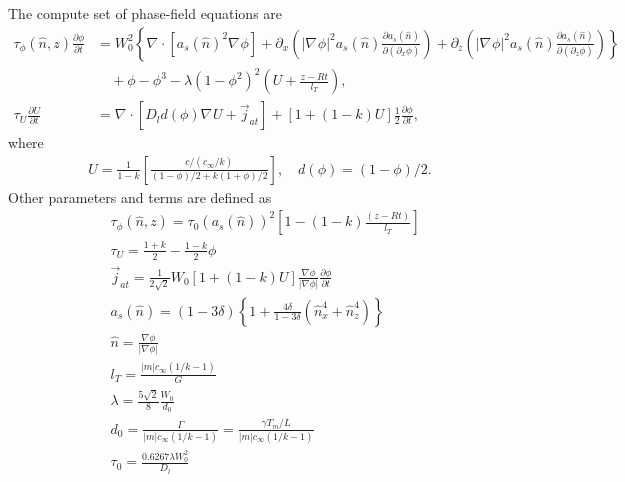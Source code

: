 \documentclass[a4paper,12pt]{article}
\renewcommand{\div}[1]{\nabla_{#1} \cdot}
\newcommand{\grad}[1]{\nabla_{#1}}
\begin{document}
The compute set of phase-field equations are 
\begin{align}
\tau_{\phi} (\hat{n},z) \frac{\partial \phi}{\partial t} &= W^2_0 \left\{ \div{} [a_s(\hat{n})^2 \grad{} \phi] +  \partial_x \left( |\grad{} \phi|^2 a_s(\hat{n}) \frac{\partial a_s(\hat{n})}{\partial (\partial_x \phi)}  \right)  +
\partial_z \left( |\grad{} \phi|^2 a_s(\hat{n}) \frac{\partial a_s(\hat{n})}{\partial (\partial_z \phi)}  \right)  \right \}  \nonumber \\
& \quad + \phi - \phi^3 - \lambda (1-\phi^2)^2 \left(U + \frac{z-R t}{ l_T} \right),  \label{eq:micro_phi}\\
\tau_U \frac{\partial U}{\partial t} &= \div{} [D_l d(\phi) \grad{} U + \vec{j}_{at}] + [1+(1-k)U]\frac{1}{2}  \frac{\partial \phi}{\partial t}, \label{eq:micro_U}
\end{align}
where 
\begin{align}
U = \frac{1}{1-k} \left[ \frac{c/(c_{\infty}/k)}{(1-\phi)/2 + k(1+\phi)/2} \right], \quad d(\phi) = (1-\phi)/2 .
\end{align}
Other parameters and terms are defined as
\begin{align}
    & \tau_{\phi}(\hat{n},z) = \tau_0(a_s(\hat{n}))^2 \left[1-(1-k) \frac{(z-Rt)}{ l_T} \right] \\
	& \tau_U = \frac{1+k}{2} - \frac{1-k}{2}\phi \\
	& \vec{j}_{at} =  \frac{1}{2\sqrt{2}} W_0 [1+(1-k)U] \frac{\nabla \phi}{|\nabla \phi|} \frac{\partial \phi}{\partial t} \\
	& a_{s}(\hat{n}) = (1-3\delta)\left\{1+\frac{4 \delta}{1-3\delta}(\hat{n}_x^4 + \hat{n}_z^4) \right\} \\
    & \hat{n} =  \frac{\nabla \phi}{|\nabla \phi|} \\
    & l_T = \frac{|m|c_{\infty}(1/k-1)}{G} \\
    & \lambda =  \frac{5\sqrt{2}}{8}  \frac{W_0}{d_0} \\
    & d_0 = \frac{\Gamma}{|m|c_{\infty}(1/k-1)} =   \frac{\gamma T_m/L}{|m|c_{\infty}(1/k-1)}  \\
    & \tau_0 =  \frac{0.6267\lambda W_0^2}{D_l}
\end{align}
\end{document}
